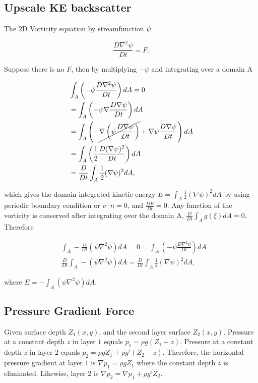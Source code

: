 \subsection{Upscale KE backscatter}

The $2$D Vorticity equation by streamfunction $\psi$

\begin{equation}
   \frac{D \nabla^2\psi}{D t} = F.
\end{equation}

Suppose there is no $F$, then by multiplying $-\psi$ and integrating over a domain A

\begin{equation}
   \begin{aligned}
      & \int_A \left( -\psi \frac{D\nabla^2\psi}{Dt} \right) dA= 0 \\
      & = \int_A \left( -\psi \nabla\frac{D\nabla\psi}{Dt} \right) dA \\
      & = \int_A \left( -\cancel{\nabla \left( \psi \frac{D \nabla\psi}{Dt} \right)} + \nabla \psi \frac{D\nabla\psi}{Dt} \right) dA \\
      & = \int_A \left( \frac{1}{2} \frac{D(\nabla\psi)^2}{Dt} \right) dA \\ 
      & = \frac{D}{Dt} \int_A \frac{1}{2} (\nabla\psi)^2 dA,
   \end{aligned}
\end{equation}

which gives the domain integrated kinetic energy $E = \int_A\frac{1}{2} (\nabla\psi)^2 dA$ by using periodic boundary condition or $v \cdot n= 0$, and $\frac{D E}{Dt}=0$.
Any function of the vorticity is conserved after integrating over the domain A, $\frac{D}{Dt} \int_A g(\xi) dA= 0$. Therefore 

\begin{equation}
   \begin{aligned}
      & \int_A -\frac{D}{Dt} (\psi \nabla^2\psi) dA= 0= \int_A \left( -\psi \frac{D\nabla^2\psi}{Dt} \right) dA \\
      & \frac{D}{Dt} \int_A -(\psi \nabla^2\psi) dA= \frac{D}{Dt} \int_A \frac{1}{2} (\nabla\psi)^2 dA,
   \end{aligned}
\end{equation}

where $E= -\int_A (\psi \nabla^2\psi) dA$.



\subsection{Pressure Gradient Force}
Given surface depth $Z_1(x,y)$, and the second layer surface $Z_2(x,y)$.
Pressure at a constant depth $z$ in layer $1$ equals $p_1= \rho g (Z_1- z)$.
Pressure at a constant depth $z$ in layer $2$ equals $p_2= \rho g Z_1 + \rho g' (Z_2- z)$.
Therefore, the horizontal pressure gradient at layer $1$ is $\nabla p_1= \rho g Z_1$ where the constant depth $z$ is eliminated.
Likewise, layer $2$ is $\nabla p_2= \nabla p_1 + \rho g' Z_2$. \\

